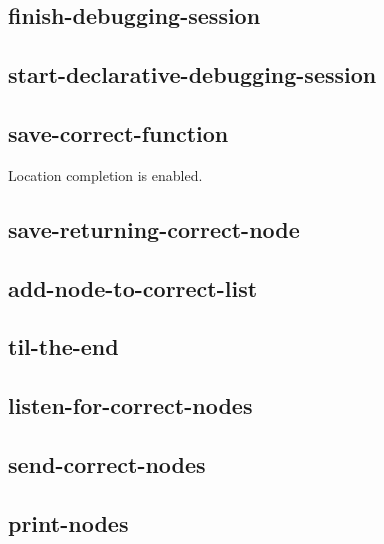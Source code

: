 \subsection{finish-debugging-session}
\subsection{start-declarative-debugging-session}
\subsection{save-correct-function}
Location completion is enabled.
\subsection{save-returning-correct-node}
\subsection{add-node-to-correct-list}
\subsection{til-the-end}
\subsection{listen-for-correct-nodes}
\subsection{send-correct-nodes}
\subsection{print-nodes}